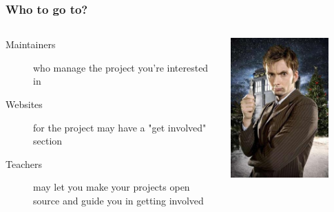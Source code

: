 \documentclass{beamer}
\begin{document}
\begin{frame}
\begin{columns}[c]
  \end{columns}
\end{frame}

\begin{frame}
  \frametitle{Who to go to?}
  \begin{columns}[c]
    \begin{description}
    \item[Maintainers] who manage the project you're interested in
    \item[Websites] for the project may have a "get involved" section
    \item[Teachers] may let you make your projects open source and guide you in getting involved
    \end{description}
    \includegraphics[width=0.8\textwidth]{../img/dr-who}
  \end{columns}
\end{frame}
\end{document}
